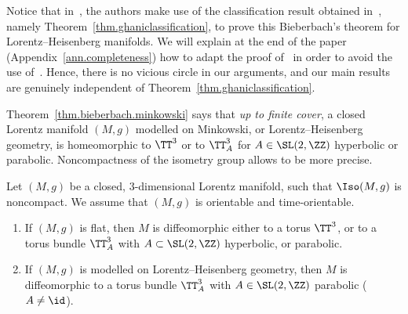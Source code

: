 Notice that in~\cite{sorin.ghani}, the authors make use of the classification result obtained in~\cite{zeghibflot}, namely Theorem~\ref{thm.ghaniclassification}, to prove this Bieberbach's theorem for Lorentz--Heisenberg manifolds. We will explain at the end of the paper (Appendix~\ref{ann.completeness}) how to adapt the proof of~\cite[Proposition~8.1]{sorin.ghani} in order to avoid the use of~\cite{zeghibflot}. Hence, there is no vicious circle in our arguments, and our main results are genuinely independent of Theorem~\ref{thm.ghaniclassification}.



Theorem~\ref{thm.bieberbach.minkowski} says that \emph{up to finite cover}, a closed Lorentz manifold $(M,g)$ modelled on Minkowski, or Lorentz--Heisenberg geometry, is homeomorphic to $\TT^3$ or to $\TT_A^3$ for $A \in \SL(2,\ZZ)$ hyperbolic or parabolic. Noncompactness of the isometry group allows to be more precise.


\begin{prop}\label{prop.topologie.minkowski}
Let $(M,g)$ be a closed, $3$-dimensional Lorentz manifold, such that $\Iso(M,g)$ is noncompact. We assume that $(M,g)$ is orientable and time-orientable.
\begin{enumerate}
\item \label{list4.6.1}If $(M,g)$ is flat, then $M$ is diffeomorphic either to a torus $\TT^3$, or to a torus bundle $\TT_A^3$ with $A \subset \SL(2,\ZZ)$ hyperbolic, or parabolic.
\item \label{list4.6.2}If $(M,g)$ is modelled on Lorentz--Heisenberg geometry, then $M$ is diffeomorphic to a torus bundle $\TT_A^3$ with $A \in \SL(2,\ZZ)$ parabolic ($A \not =\id$).
\end{enumerate}
\end{prop}

